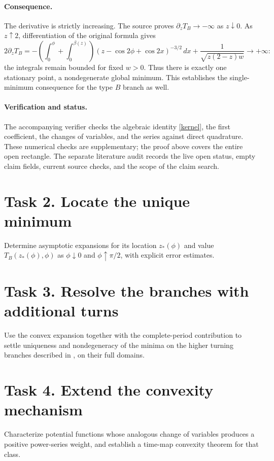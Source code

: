 \documentclass[11pt]{article}
\begin{document}
\paragraph{Consequence.}
The derivative is strictly increasing. The source proves
\(\partial_zT_B\to-\infty\) as \(z\downarrow0\).
As \(z\uparrow2\), differentiation of the original formula gives
\[
 2\partial_zT_B=
 -\left(\int_0^\phi+\int_0^{\beta(z)}\right)
       (z-\cos2\phi+\cos2x)^{-3/2}\,dx
 +\frac1{\sqrt{z(2-z)w}}\longrightarrow+\infty:
\]
the integrals remain bounded for fixed \(w>0\).
Thus there is exactly one stationary point, a nondegenerate global
minimum. This establishes the single-minimum consequence for the
type \(B\) branch as well.

\paragraph{Verification and status.}
The accompanying verifier checks the algebraic identity
\eqref{kernel}, the first coefficient, the changes of variables, and
the series against direct quadrature. These numerical checks are
supplementary; the proof above covers the entire open rectangle.
The separate literature audit records the live open status, empty
claim fields, current source checks, and the scope of the claim search.

\section*{Task 2. Locate the unique minimum}
Determine asymptotic expansions for its location \(z_*(\phi)\) and
value \(T_B(z_*(\phi),\phi)\) as \(\phi\downarrow0\) and
\(\phi\uparrow\pi/2\), with explicit error estimates.

\section*{Task 3. Resolve the branches with additional turns}
Use the convex expansion together with the complete-period contribution
to settle uniqueness and nondegeneracy of the minima on the higher
turning branches described in \cite{later}, on their full domains.

\section*{Task 4. Extend the convexity mechanism}
Characterize potential functions whose analogous change of variables
produces a positive power-series weight, and establish a time-map
convexity theorem for that class.
\end{document}
